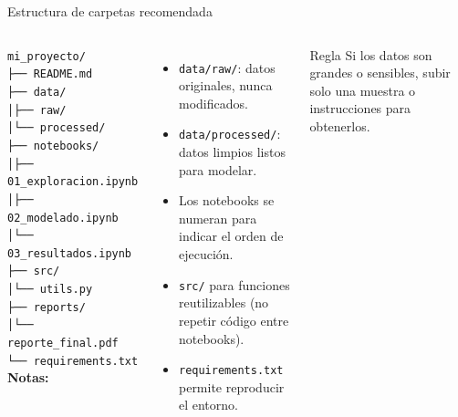\documentclass[aspectratio=169]{beamer}
\begin{document}
\begin{frame}{Estructura de carpetas recomendada}
  \begin{columns}
\texttt{mi\_proyecto/}\\
\texttt{├── README.md}\\
\texttt{├── data/}\\
\texttt{│\phantom{xx}├── raw/}\\
\texttt{│\phantom{xx}└── processed/}\\
\texttt{├── notebooks/}\\
\texttt{│\phantom{xx}├── 01\_exploracion.ipynb}\\
\texttt{│\phantom{xx}├── 02\_modelado.ipynb}\\
\texttt{│\phantom{xx}└── 03\_resultados.ipynb}\\
\texttt{├── src/}\\
\texttt{│\phantom{xx}└── utils.py}\\
\texttt{├── reports/}\\
\texttt{│\phantom{xx}└── reporte\_final.pdf}\\
\texttt{└── requirements.txt}
      \textbf{Notas:}
      \begin{itemize}
        \item \texttt{data/raw/}: datos originales, nunca modificados.
        \item \texttt{data/processed/}: datos limpios listos para modelar.
        \item Los notebooks se numeran para indicar el orden de ejecución.
        \item \texttt{src/} para funciones reutilizables (no repetir código entre notebooks).
        \item \texttt{requirements.txt} permite reproducir el entorno.
      \end{itemize}
      \bigskip
      \begin{alertblock}{Regla}
        Si los datos son grandes o sensibles, subir solo una muestra o instrucciones para obtenerlos.
      \end{alertblock}
  \end{columns}
\end{frame}
\end{document}
